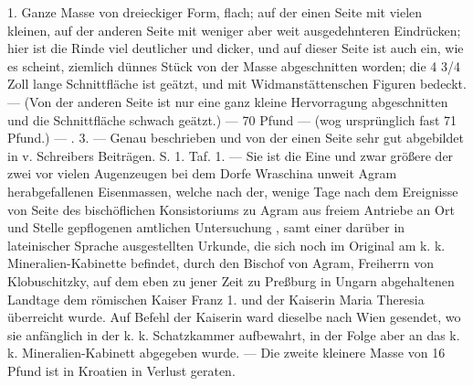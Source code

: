 \documentclass[a4paper, 11pt, oneside, polutonikogreek, german]{article}
\begin{document}
1. Ganze Masse von dreieckiger Form, flach; auf der einen Seite mit vielen kleinen, auf der anderen Seite mit weniger aber weit ausgedehnteren Eindrücken; hier ist die Rinde viel deutlicher und dicker, und auf dieser Seite ist auch ein, wie es scheint, ziemlich dünnes Stück von der Masse abgeschnitten worden; die 4 3/4 Zoll lange Schnittfläche ist geätzt, und mit Widmanstättenschen Figuren bedeckt. — (Von der anderen Seite ist nur eine ganz kleine Hervorragung abgeschnitten und die Schnittfläche schwach geätzt.) — 70 Pfund — (wog ursprünglich fast 71 Pfund.) — . 3. — Genau beschrieben und von der einen Seite sehr gut abgebildet in v. Schreibers Beiträgen. S. 1. Taf. 1. — Sie ist die Eine und zwar größere der zwei vor vielen Augenzeugen bei dem Dorfe Wraschina unweit Agram herabgefallenen Eisenmassen, welche nach der, wenige Tage nach dem Ereignisse von Seite des bischöflichen Konsistoriums zu Agram aus freiem Antriebe an Ort und Stelle gepflogenen amtlichen Untersuchung , samt einer darüber in lateinischer Sprache ausgestellten Urkunde, die sich noch im Original am k. k. Mineralien-Kabinette befindet, durch den Bischof von Agram, Freiherrn von Klobuschitzky, auf dem eben zu jener Zeit zu Preßburg in Ungarn abgehaltenen Landtage dem römischen Kaiser Franz 1. und der Kaiserin Maria Theresia überreicht wurde. Auf Befehl der Kaiserin ward dieselbe nach Wien gesendet, wo sie anfänglich in der k. k. Schatzkammer aufbewahrt, in der Folge aber an das k. k. Mineralien-Kabinett abgegeben wurde. — Die zweite kleinere Masse von 16 Pfund ist in Kroatien in Verlust geraten.
\end{document}
